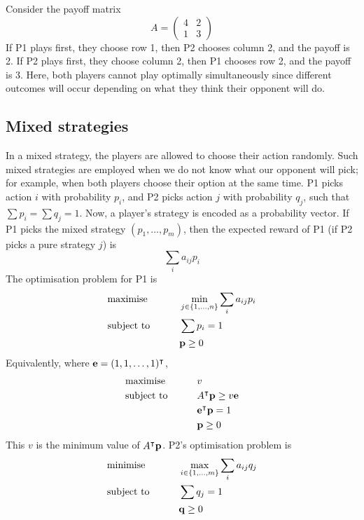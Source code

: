 \begin{example}
	Consider the payoff matrix
	\[
		A = \begin{pmatrix}
			4 & 2 \\ 1 & 3
		\end{pmatrix}
	\]
	If P1 plays first, they choose row 1, then P2 chooses column 2, and the payoff is 2.
	If P2 plays first, they choose column 2, then P1 chooses row 2, and the payoff is 3.
	Here, both players cannot play optimally simultaneously since different outcomes will occur depending on what they think their opponent will do.
\end{example}

\subsection{Mixed strategies}
In a mixed strategy, the players are allowed to choose their action randomly.
Such mixed strategies are employed when we do not know what our opponent will pick; for example, when both players choose their option at the same time.
P1 picks action \( i \) with probability \( p_i \), and P2 picks action \( j \) with probability \( q_j \), such that \( \sum p_i = \sum q_j = 1 \).
Now, a player's strategy is encoded as a probability vector.
If P1 picks the mixed strategy \( (p_1, \dots, p_m) \), then the expected reward of P1 (if P2 picks a pure strategy \( j \)) is
\[
	\sum_i a_{ij} p_i
\]
The optimisation problem for P1 is
\begin{alignat*}{2}
	 & \text{maximise}   & \qquad & \min_{j \in \qty{1,\dots,n}} \sum_i a_{ij} p_i \\
	 & \text{subject to} &        & \sum p_i = 1                                   \\
	 &                   &        & \vb p \geq 0
\end{alignat*}
Equivalently, where \( \vb e = (1,1,\dots,1)^\intercal \),
\begin{alignat*}{2}
	 & \text{maximise}   & \qquad & v                               \\
	 & \text{subject to} &        & A^\intercal \vb p \geq v \vb e \\
	 &                   &        & \vb e^\intercal \vb p = 1      \\
	 &                   &        & \vb p \geq 0
\end{alignat*}
This \( v \) is the minimum value of \( A^\intercal \vb p \).
P2's optimisation problem is
\begin{alignat*}{2}
	 & \text{minimise}   & \qquad & \max_{i \in \qty{1,\dots,m}} \sum_i a_{ij} q_j \\
	 & \text{subject to} &        & \sum q_j = 1                                   \\
	 &                   &        & \vb q \geq 0
\end{alignat*}
